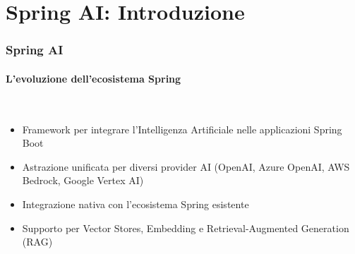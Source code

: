 \section{Spring AI: Introduzione} %
\label{sec:spring_ai_intro}
%
\begin{frame}[t,fragile] \frametitle{Spring AI}
	{\scriptsize
		\onslide<1->
            \framesubtitle{L'evoluzione dell'ecosistema Spring}
            \vspace*{-15pt}
            \begin{minipage}[t]{\textwidth}
            \end{minipage}
            \\\vspace*{3pt}
	    	\begin{minipage}[t]{\textwidth}
				\begin{minipage}[t]{0.6\textwidth}
	    			\begin{itemize}[leftmargin=10pt,align=right]
						\onslide<2->\item[\alert{\faHandORight}] Framework per \alert{integrare l'Intelligenza Artificiale} nelle applicazioni Spring Boot
						\onslide<3->\item[\alert{\faHandORight}] \alert{Astrazione unificata} per diversi provider AI (OpenAI, Azure OpenAI, AWS Bedrock, Google Vertex AI)
						\onslide<4->\item[\alert{\faHandORight}] Integrazione \alert{nativa} con l'ecosistema Spring esistente
						\onslide<5->\item[\alert{\faHandORight}] Supporto per \alert{Vector Stores}, \alert{Embedding} e \alert{Retrieval-Augmented Generation (RAG)}
					\end{itemize}
            	\end{minipage}
            	\begin{minipage}[t]{0.4\textwidth}
            	\end{minipage}
	    	\end{minipage}
	}
\end{frame}
